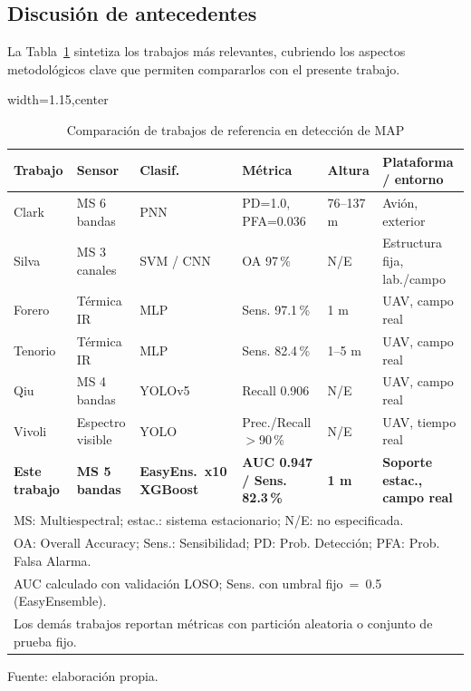\subsection{Discusión de antecedentes}

La Tabla~\ref{tab:antecedentes} sintetiza los trabajos más relevantes,
cubriendo los aspectos metodológicos clave que permiten compararlos con el
presente trabajo.

\begin{table}[H]
\centering
\caption{Comparación de trabajos de referencia en detección de \ac{MAP}}
\label{tab:antecedentes}
\footnotesize
\begin{adjustbox}{width=1.15\textwidth,center}
\begin{tabular}{p{2.0cm}p{2.2cm}p{2.4cm}p{2.0cm}p{1.4cm}p{2.2cm}}
\toprule
\textbf{Trabajo} & \textbf{Sensor} & \textbf{Clasif.} &
\textbf{Métrica} & \textbf{Altura} & \textbf{Plataforma / entorno} \\
\midrule
Clark \etal{} \cite{clark2000}
  & MS 6 bandas & PNN & PD=1.0, PFA=0.036 & 76--137 m & Avión, exterior \\
Silva \etal{} \cite{silva2019}
  & MS 3 canales & SVM / CNN & OA 97\,\% & N/E & Estructura fija, lab./campo \\
Forero \etal{} \cite{forero2022}
  & Térmica IR & MLP & Sens. 97.1\,\% & 1 m & UAV, campo real \\
Tenorio \etal{} \cite{tenorio2024}
  & Térmica IR & MLP & Sens. 82.4\,\% & 1--5 m & UAV, campo real \\
Qiu \etal{} \cite{qiu2023}
  & MS 4 bandas & YOLOv5 & Recall 0.906 & N/E & UAV, campo real \\
Vivoli \etal{} \cite{vivoli2024}
  & Espectro visible & YOLO & Prec./Recall $>$90\,\% & N/E & UAV, tiempo real \\
\midrule
\textbf{Este trabajo}
  & \textbf{MS 5 bandas} & \textbf{EasyEns.~x10 XGBoost} & \textbf{AUC 0.947 / Sens. 82.3\,\%} & \textbf{1 m} & \textbf{Soporte estac., campo real} \\
\bottomrule
\multicolumn{6}{l}{\small MS: Multiespectral; estac.: sistema estacionario; N/E: no especificada.} \\
\multicolumn{6}{l}{\small OA: Overall Accuracy; Sens.: Sensibilidad; PD: Prob. Detección; PFA: Prob. Falsa Alarma.} \\
\multicolumn{6}{l}{\small AUC calculado con validación LOSO; Sens. con umbral fijo~=~0.5 (EasyEnsemble).} \\
\multicolumn{6}{l}{\small Los demás trabajos reportan métricas con partición aleatoria o conjunto de prueba fijo.}
\end{tabular}
\end{adjustbox}

  {\footnotesize Fuente: elaboración propia.}
\end{table}

